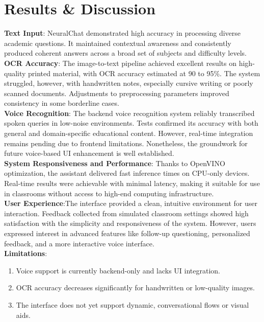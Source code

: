 \documentclass{josis}
\begin{document}
\section{Results \& Discussion}
\textbf{Text Input}: NeuralChat demonstrated high accuracy in processing diverse academic questions. It maintained contextual awareness and consistently produced coherent answers across a broad set of subjects and difficulty levels.\\
\textbf{OCR Accuracy}: The image-to-text pipeline achieved excellent results on high-quality printed material, with OCR accuracy estimated at 90 to 95\%. The system struggled, however, with handwritten notes, especially cursive writing or poorly scanned documents. Adjustments to preprocessing parameters improved consistency in some borderline cases.\\
\textbf{Voice Recognition}: The backend voice recognition system reliably transcribed spoken queries in low-noise environments. Tests confirmed its accuracy with both general and domain-specific educational content. However, real-time integration remains pending due to frontend limitations. Nonetheless, the groundwork for future voice-based UI enhancement is well established.\\
\textbf{System Responsiveness and Performance}: Thanks to OpenVINO optimization, the assistant delivered fast inference times on CPU-only devices. Real-time results were achievable with minimal latency, making it suitable for use in classrooms without access to high-end computing infrastructure.\\
\textbf{User Experience}:The interface provided a clean, intuitive environment for user interaction. Feedback collected from simulated classroom settings showed high satisfaction with the simplicity and responsiveness of the system. However, users expressed interest in advanced features like follow-up questioning, personalized feedback, and a more interactive voice interface.\\
\textbf{Limitations}:
\begin{enumerate}
\item Voice support is currently backend-only and lacks UI integration.
\item OCR accuracy decreases significantly for handwritten or low-quality images.
\item The interface does not yet support dynamic, conversational flows or visual aids.
\end{enumerate}
\end{document}
